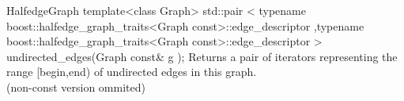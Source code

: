\begin{ccRefConcept}{HalfedgeGraph}
  \ccFunction
  {template<class Graph>
  std::pair < typename boost::halfedge_graph_traits<Graph const>::edge_descriptor
             ,typename boost::halfedge_graph_traits<Graph const>::edge_descriptor
             >   
  undirected_edges(Graph const& g );
  }
  {Returns a pair of iterators representing the range [begin,end) of undirected edges in this graph.\\
  (non-const version ommited)
  }

\ccHasModels
{}\\
\\

\end{ccRefConcept}

